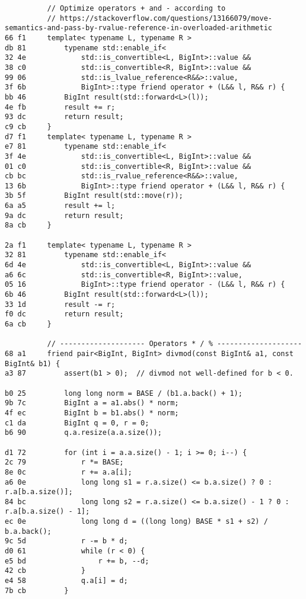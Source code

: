 \documentclass[11pt, a4paper, twoside]{article}
\begin{document}
\begin{lstlisting}
          // Optimize operators + and - according to
          // https://stackoverflow.com/questions/13166079/move-semantics-and-pass-by-rvalue-reference-in-overloaded-arithmetic
66 f1     template< typename L, typename R >
db 81         typename std::enable_if<
32 4e             std::is_convertible<L, BigInt>::value &&
38 c0             std::is_convertible<R, BigInt>::value &&
99 06             std::is_lvalue_reference<R&&>::value,
3f 6b             BigInt>::type friend operator + (L&& l, R&& r) {
bb 46         BigInt result(std::forward<L>(l));
4e fb         result += r;
93 dc         return result;
c9 cb     }
d7 f1     template< typename L, typename R >
e7 81         typename std::enable_if<
3f 4e             std::is_convertible<L, BigInt>::value &&
01 c0             std::is_convertible<R, BigInt>::value &&
cb bc             std::is_rvalue_reference<R&&>::value,
13 6b             BigInt>::type friend operator + (L&& l, R&& r) {
3b 5f         BigInt result(std::move(r));
6a a5         result += l;
9a dc         return result;
8a cb     }
      
2a f1     template< typename L, typename R >
32 81         typename std::enable_if<
6d 4e             std::is_convertible<L, BigInt>::value &&
a6 6c             std::is_convertible<R, BigInt>::value,
05 16             BigInt>::type friend operator - (L&& l, R&& r) {
6b 46         BigInt result(std::forward<L>(l));
33 1d         result -= r;
f0 dc         return result;
6a cb     }
      
          // -------------------- Operators * / % --------------------
68 a1     friend pair<BigInt, BigInt> divmod(const BigInt& a1, const BigInt& b1) {
a3 87         assert(b1 > 0);  // divmod not well-defined for b < 0.
      
b0 25         long long norm = BASE / (b1.a.back() + 1);
9b 7c         BigInt a = a1.abs() * norm;
4f ec         BigInt b = b1.abs() * norm;
c1 da         BigInt q = 0, r = 0;
b6 90         q.a.resize(a.a.size());
      
d1 72         for (int i = a.a.size() - 1; i >= 0; i--) {
2c 79             r *= BASE;
8e 0c             r += a.a[i];
a6 0e             long long s1 = r.a.size() <= b.a.size() ? 0 : r.a[b.a.size()];
84 bc             long long s2 = r.a.size() <= b.a.size() - 1 ? 0 : r.a[b.a.size() - 1];
ec 0e             long long d = ((long long) BASE * s1 + s2) / b.a.back();
9c 5d             r -= b * d;
d0 61             while (r < 0) {
e5 bd                 r += b, --d;
42 cb             }
e4 58             q.a[i] = d;
7b cb         }
      

\end{lstlisting}
\end{document}
